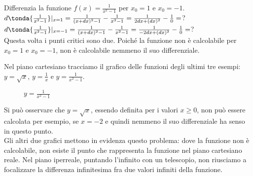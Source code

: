 \begin{esempio}
Differenzia la funzione $f(x)=\frac{1}{x^2-1}$ per $x_0=1$ e $x_0=-1$.\\
$d\tonda{\frac{1}{x^2-1}}|_{x=1}=\frac{1}{(x+dx)^2-1}-\frac{1}{x^2-1}=
\frac{1}{2dx+(dx)^2}-\frac{1}{0}=$?\\
$d\tonda{\frac{1}{x^2-1}}|_{x=-1}=\frac{1}{(x+dx)^2-1}-\frac{1}{x^2-1}=
\frac{1}{-2dx+(dx)^2}-\frac{1}{0}=$?\\
Questa volta i punti critici sono due. Poiché la funzione non è calcolabile
per $x_0=1$ e $x_0=-1$, non è calcolabile nemmeno il suo differenziale.
\end{esempio}

Nel piano cartesiano tracciamo il grafico delle funzioni degli ultimi 
tre esempi: $y=\sqrt{x}$, $y=\frac{1}{x}$ e $y=\frac{1}{x^2-1}$.
\begin{figure}[h]
\begin{inaccessibleblock}
 \begin{center}
 \begin{minipage}[]{.23 \textwidth}
  \vspace*{4mm} 
  \radice
  \caption{$y=\sqrt{x}$}
 \end{minipage} 
 \begin{minipage}[]{.37 \textwidth}
  \iperbole
  \caption{$y=\frac{1}{x}$}
 \end{minipage} 
 \begin{minipage}[]{.37 \textwidth}
  \iperbolequad
  \caption{$y=\frac{1}{x^2-1}$}
 \end{minipage}
 \end{center}
\end{inaccessibleblock}
\label{fig:diff01_grafici}
\end{figure}

Si può osservare che $y=\sqrt{x}$, essendo definita per i valori $x\ge 0$, 
non può essere calcolata per esempio, se $x=-2$ e quindi nemmeno il suo 
differenziale ha senso in questo punto.\\
Gli altri due grafici mettono in evidenza questo problema: dove la funzione 
non è calcolabile, non esiste il punto che rappresenta la funzione nel piano 
cartesiano reale. Nel piano iperreale, puntando l'infinito con un telescopio,
non riusciamo a focalizzare la differenza infinitesima fra due valori infiniti
della funzione.



